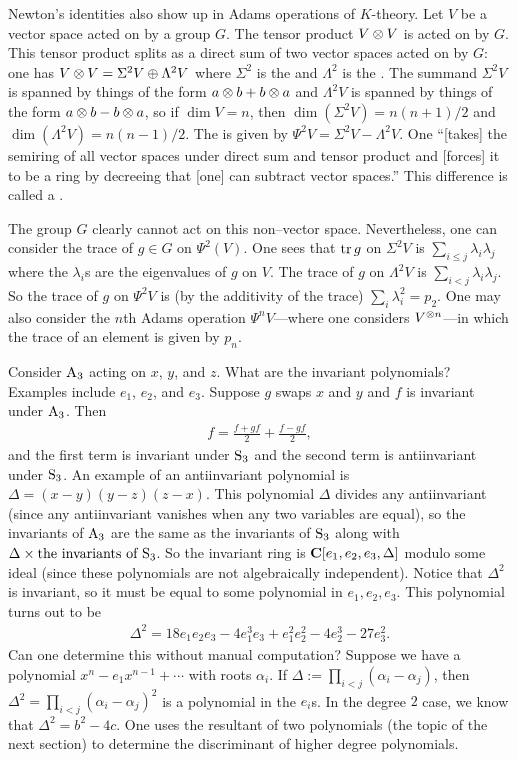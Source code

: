 \documentclass[11pt, oneside,margin=1in]{article}
\begin{document}
Newton's identities also show up in Adams operations of $K$-theory. Let $V$ be a vector space acted on by a group $G$. The tensor product $V\otimes V$ is acted on by $G$. This tensor product splits as a direct sum of two vector spaces acted on by $G$: one has $V\otimes V = \Sigma^2 V \oplus \Lambda^2 V$ where $\Sigma^2$ is the  and $\Lambda ^2$ is the . The summand $\Sigma^2 V$ is spanned by things of the form $a\otimes b + b\otimes a$ and $\Lambda^2 V$ is spanned by things of the form $a\otimes b - b\otimes a$, so if $\dim V = n$, then $\dim (\Sigma ^2 V) = n (n+1)/2$ and $\dim(\Lambda^2V) = n (n-1)/2$. The  is given by $\Psi^2V = \Sigma^2 V - \Lambda^2 V$. One ``[takes] the semiring of all vector spaces under direct sum and tensor product and [forces] it to be a ring by decreeing that [one] can subtract vector spaces.'' This difference is called a . 

The group $G$ clearly cannot act on this non--vector space. Nevertheless, one can consider the trace of $g\in G$ on $\Psi^2 (V)$. One sees that $\operatorname{tr} g$ on $\Sigma^2 V$ is $\sum_{i\le j} \lambda_i\lambda_j$ where the $\lambda_i$s are the eigenvalues of $g$ on $V$. The trace of $g$ on $\Lambda^2 V$ is $\sum_{i<j} \lambda_i\lambda_j$. So the trace of $g$ on $\Psi^2 V$ is (by the additivity of the trace) $\sum_{i} \lambda_i^2=p_2$. One may also consider the $n$th Adams operation $\Psi^nV$---where one considers $V^{\otimes n}$---in which the trace of an element is given by $p_n$.

Consider $\operatorname{A}_3$ acting on $x$, $y$, and $z$. What are the invariant polynomials? Examples include $e_1$, $e_2$, and $e_3$. Suppose $g$ swaps $x$ and $y$ and $f$ is invariant under $\operatorname{A}_3$. Then 
\begin{align*}
	f = \frac{f + gf}{2} + \frac{f-gf}{2},
\end{align*}
and the first term is invariant under $\operatorname{S}_3$ and the second term is antiinvariant under $\operatorname{S}_3$. An example of an antiinvariant polynomial is $\Delta = (x-y) (y-z) (z-x)$. This polynomial $\Delta $ divides any antiinvariant (since any antiinvariant vanishes when any two variables are equal), so the invariants of $\operatorname{A}_3$ are the same as the invariants of $\operatorname{S}_3$ along with $\Delta \times\textrm{the invariants of $\operatorname{S}_3$}$. So the invariant ring is $\mathbf C[e_1,e_2,e_3,\Delta]$ modulo some ideal (since these polynomials are not algebraically independent). Notice that $\Delta^2 $ is invariant, so it must be equal to some polynomial in $e_1, e_2, e_3$. This polynomial turns out to be 
\begin{align*}
	\Delta^2 = 18e_1e_2e_3 - 4e_1^3e_3 + e_1^2 e_2^2 - 4e_2 ^3 - 27 e_3^2.
\end{align*}
Can one determine this without manual computation? Suppose we have a polynomial $x^n - e_1x^{n-1} +\cdots$ with roots $\alpha_i$. If $\Delta := \prod_{i<j} (\alpha_i - \alpha_j)$, then $\Delta^2 = \prod_{i<j} (\alpha_i-\alpha_j)^2$ is a polynomial in the $e_i$s. In the degree $2$ case, we know that $\Delta^2 = b^2 - 4c$. One uses the resultant of two polynomials (the topic of the next section) to determine the discriminant of higher degree polynomials.
\end{document}
